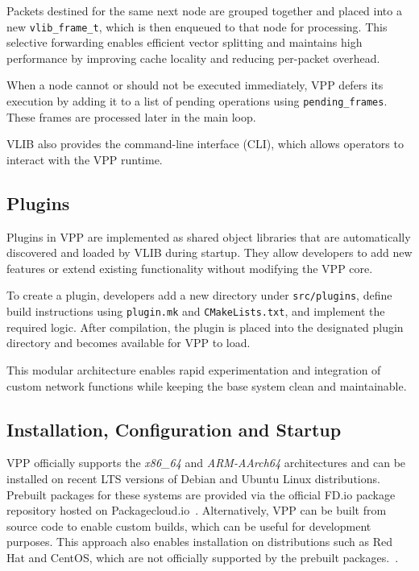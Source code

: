 Packets destined for the same next node are grouped together and placed into a new \texttt{vlib\_frame\_t}, which is then enqueued to that node for processing.
This selective forwarding enables efficient vector splitting and maintains high performance by improving cache locality and reducing per-packet overhead.

When a node cannot or should not be executed immediately, 
VPP defers its execution by adding it to a list of pending operations using \texttt{pending\_frames}.
These frames are processed later in the main loop.

VLIB also provides the command-line interface (CLI), which allows operators to interact with the VPP runtime.~\cite{fdio-vpp-vlib-2506}

\subsection{Plugins}
Plugins in VPP are implemented as shared object libraries that are automatically discovered and loaded by VLIB during startup. 
They allow developers to add new features or extend existing functionality without modifying the VPP core.

To create a plugin, developers add a new directory under \texttt{src/plugins}, define build instructions using \texttt{plugin.mk} and \texttt{CMakeLists.txt}, and implement the required logic. 
After compilation, the plugin is placed into the designated plugin directory and becomes available for VPP to load.

This modular architecture enables rapid experimentation and integration of custom network functions while keeping the base system clean and maintainable.~\cite{fdio-vpp-plugins-2506, fdio-vpp-addplugin-2506}

\subsection{Installation, Configuration and Startup}
VPP officially supports the \textit{x86\_64} and \textit{ARM-AArch64} architectures and can be installed on recent LTS versions of Debian and Ubuntu Linux distributions.~\cite{fdio-supported-2025}
Prebuilt packages for these systems are provided via the official FD.io package repository hosted on Packagecloud.io~\cite{fdio-packagecloud}.
Alternatively, VPP can be built from source code to enable custom builds, which can be useful for development purposes.
This approach also enables installation on distributions such as Red Hat and CentOS, which are not officially supported by the prebuilt packages.~\cite{fdio-building-guide}.

